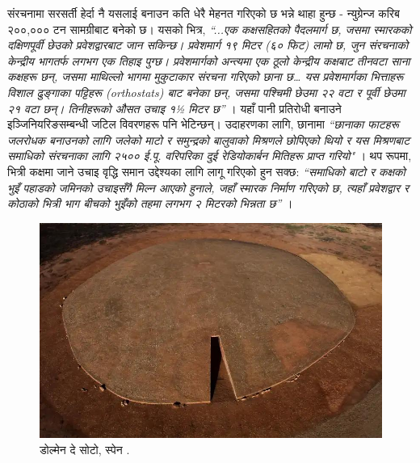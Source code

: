 \documentclass[10pt,twocolumn,letterpaper]{article}
\begin{document}
संरचनामा सरसर्ती हेर्दा नै यसलाई बनाउन कति धेरै मेहनत गरिएको छ भन्ने थाहा हुन्छ - न्युग्रेन्ज करिब २००,००० टन सामग्रीबाट बनेको छ। यसको भित्र, \textit{“...एक कक्षसहितको पैदलमार्ग छ, जसमा स्मारकको दक्षिणपूर्वी छेउको प्रवेशद्वारबाट जान सकिन्छ। प्रवेशमार्ग १९ मिटर (६० फिट) लामो छ, जुन संरचनाको केन्द्रीय भागतर्फ लगभग एक तिहाइ पुग्छ। प्रवेशमार्गको अन्त्यमा एक ठूलो केन्द्रीय कक्षबाट तीनवटा साना कक्षहरू छन्, जसमा माथिल्लो भागमा मुकुटाकार संरचना गरिएको छाना छ… यस प्रवेशमार्गका भित्ताहरू विशाल ढुङ्गाका पट्टिहरू (orthostats) बाट बनेका छन्, जसमा पश्चिमी छेउमा २२ वटा र पूर्वी छेउमा २१ वटा छन्। तिनीहरूको औसत उचाइ १½ मिटर छ”} \cite{70}। यहाँ पानी प्रतिरोधी बनाउने इञ्जिनियरिङसम्बन्धी जटिल विवरणहरू पनि भेटिन्छन्। उदाहरणका लागि, छानामा \textit{“छानाका फाटहरू जलरोधक बनाउनको लागि जलेको माटो र समुन्द्रको बालुवाको मिश्रणले छोपिएको थियो र यस मिश्रणबाट समाधिको संरचनाका लागि २५०० ई.पू. वरिपरिका दुई रेडियोकार्बन मितिहरू प्राप्त गरियो"} \cite{71}। थप रूपमा, भित्री कक्षमा जाने उचाइ वृद्धि समान उद्देश्यका लागि लागू गरिएको हुन सक्छ: \textit{“समाधिको बाटो र कक्षको भुइँ पहाडको जमिनको उचाइसँगै मिल्न आएको हुनाले, जहाँ स्मारक निर्माण गरिएको छ, त्यहाँ प्रवेशद्वार र कोठाको भित्री भाग बीचको भुइँको तहमा लगभग २ मिटरको भिन्नता छ”} \cite{71}।

\begin{figure}[b]
\begin{center}
   \includegraphics[width=1\linewidth]{dolmen.jpg}
\end{center}
   \caption{डोल्मेन दे सोटो, स्पेन \cite{53}.}
\label{fig:9}
\label{fig:onecol}
\end{figure}
\end{document}
